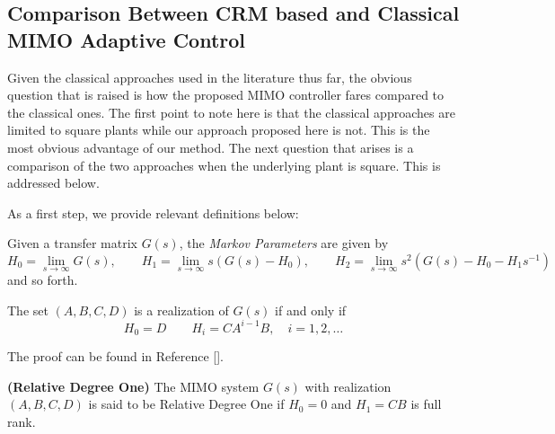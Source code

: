 \documentclass[]{../sty/aiaa-tc}
\begin{document}
  \subsection{Comparison Between CRM based and Classical MIMO Adaptive Control}

  Given the classical approaches used in the  literature thus far, the obvious question that is raised is how the proposed MIMO controller fares compared to the classical ones.
  The first point to note here is that the classical approaches are limited to square plants while our approach proposed here is not.
  This is the most obvious advantage of our method.
  The next question that arises is a comparison of the two approaches when the underlying plant is square.
  This is addressed below.

  As a first step, we provide relevant definitions below:

  \begin{defn-dan}\label{defn.markov}
    Given a transfer matrix $G(s)$, the \textit{Markov Parameters} are given by
    \begin{equation*}
      H_{0}=\lim_{s\rightarrow\infty}G(s),
      \qquad
      H_{1}=\lim_{s\rightarrow\infty}s(G(s)-H_{0}),
      \qquad
      H_{2}=\lim_{s\rightarrow\infty}s^{2}(G(s)-H_{0}-H_{1}s^{-1})
    \end{equation*}
    and so forth.
  \end{defn-dan}

  \begin{thm-dan}\label{thm.markov_realization}
    The set $(A,B,C,D)$ is a realization of $G(s)$ if and only if
    \begin{equation*}
      H_{0}=D
      \qquad
      H_{i}=CA^{i-1}B,
      \quad
      i=1,2,\dots
    \end{equation*}
  \end{thm-dan}

  \begin{proof-dan}
    The proof can be found in Reference [].
  \end{proof-dan}

  \begin{defn-dan}
    \textbf{(Relative Degree One)}\label{defn.relativedegreeone}
    The MIMO system $G(s)$ with realization $(A,B,C,D)$ is said to be Relative Degree One if $H_{0}=0$ and $H_{1}=CB$ is full rank.
  \end{defn-dan}
\end{document}
